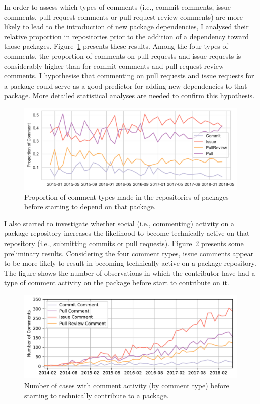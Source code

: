 In order to assess which types of comments (i.e., commit comments, issue comments, pull request comments or pull request review comments) are more likely to lead to the introduction of new package dependencies, I analysed their relative proportion in repositories prior to the addition of a dependency toward those packages. Figure~\ref{fig:fig2} presents these results. 
Among the four types of comments, the proportion of comments on pull requests and issue requests is considerably higher than for commit comments and pull request review comments. I hypothesise that commenting on pull requests and issue requests for a package could serve as a good predictor for adding new dependencies to that package. More detailed statistical analyses are needed to confirm this hypothesis.

\begin{figure}[htb]
\vspace{-0.3cm}
    \includegraphics[width=0.9\columnwidth]{Photos/RQ22.pdf} 
\vspace{-0.3cm}
    \caption{Proportion of comment types made in the repositories of packages before starting to depend on that package.}
    \label{fig:fig2}
\end{figure}

I also started to investigate whether social (i.e., commenting) activity on a package repository increases the likelihood to become technically active on that repository (i.e., submitting commits or pull requests). 
Figure~\ref{fig:fig3} presents some preliminary results. Considering the four comment types, issue comments appear to be more likely to result in becoming technically active on a package repository.
The figure shows the number of observations in which the contributor have had a type of comment activity on the package before start to contribute on it.

\begin{figure}[thb]
\vspace{-0.3cm}
    \includegraphics[width=0.9\columnwidth]{Photos/RQ3.pdf} 
\vspace{-0.3cm}
    \caption{Number of cases with comment activity (by comment type) before starting to technically contribute to a package.}
    \label{fig:fig3}
\end{figure}


